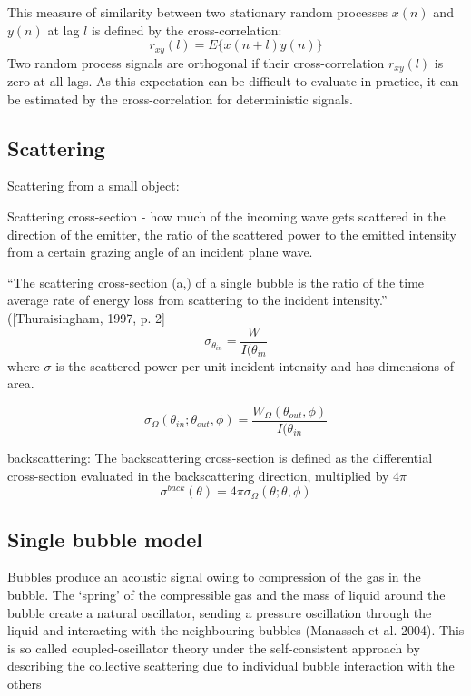 \documentclass[11pt]{article}
\begin{document}
This measure of similarity between two stationary random processes $x(n)$ and $y(n)$ at lag $l$ is defined by the cross-correlation:
\[r_{xy}(l) = E\{x(n + l)y(n)\} \]
Two random process signals are orthogonal if their cross-correlation $r_{xy}(l)$ is zero at all lags.
As this expectation can be difficult to evaluate in practice, it can be estimated by the cross-correlation for deterministic signals.

\subsection{Scattering}
	Scattering from a small object: 
	
	Scattering cross-section -  how much of the incoming wave gets scattered in the direction of the emitter, the ratio of the scattered power to the emitted intensity from a certain grazing angle of an incident plane wave.

 “The scattering cross-section (a,) of a single bubble is the ratio of the time average rate of energy loss from scattering to the incident intensity.” ([Thuraisingham, 1997, p. 2]\cite{thuraisingham_new_1997}
	\[ \sigma_{\theta_{in}} = \frac{W}{I(\theta_{in}}\] where $\sigma$ is the scattered power per unit incident intensity and has dimensions of area.
	
	\[ \sigma_{\Omega}(\theta_{in}; \theta_{out}, \phi ) = \frac{W_{\Omega}(\theta_{out}, \phi )}{I(\theta_{in}}\]  
	


	backscattering: The backscattering cross-section is defined as the differential cross-section evaluated in the backscattering direction, multiplied by $4\pi$
\begin{equation}\label{eq:backscattering}
\sigma^{back}(\theta) =4\pi \sigma_{\Omega}(\theta; \theta, \phi ) 
\end{equation}
	
	

\subsection{Single bubble model}
	Bubbles produce an acoustic signal owing to compression of the gas in the bubble. The ‘spring’ of the compressible gas and the mass of liquid around the bubble create a natural oscillator, sending a pressure oscillation through the liquid and interacting with the neighbouring bubbles (Manasseh et al. 2004)\cite{manasseh_anisotropy_2004}. This is so called coupled-oscillator theory under the self-consistent approach by describing the collective scattering due to individual bubble interaction with the others
\end{document}
